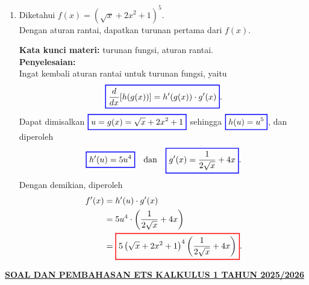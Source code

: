 \documentclass[10pt,openany,a4paper]{article}
\theoremstyle{definition}
\theoremstyle{definition}
\theoremstyle{plain}
\newenvironment{jawab}[2][tes]{%
\par\noindent\textbf{Kata kunci materi:} #1.\\
\textbf{Penyelesaian:} #2%
}{}
\begin{document}
\begin{enumerate}
\begin{jawab}[limit fungsi, fungsi kontinu, polinomial]
{            }
            \end{jawab}
            \item Diketahui $f(x)=(\sqrt{x}+2x^2+1)^5$.\\
            Dengan aturan rantai, dapatkan turunan pertama dari $f(x)$.
            \begin{jawab}[turunan fungsi, aturan rantai]{~\\
                Ingat kembali aturan rantai untuk turunan fungsi, yaitu
                \[
                \colorlet{oldcolor}{.}
        \color{blue}
        \setlength{\fboxrule}{1pt} \boxed{\color{oldcolor}\frac{d}{dx}[h(g(x))] = h'(g(x)) \cdot g'(x)}\color{oldcolor}.
                \]
                Dapat dimisalkan $\colorlet{oldcolor}{.}
        \color{blue}
        \setlength{\fboxrule}{1pt} \boxed{\color{oldcolor}u=g(x) = \sqrt{x}+2x^2+1}\color{oldcolor}$ sehingga $\colorlet{oldcolor}{.}
        \color{blue}
        \setlength{\fboxrule}{1pt} \boxed{\color{oldcolor}h(u) = u^{5}}\color{oldcolor}$, dan diperoleh
                \begin{align*}
                    \colorlet{oldcolor}{.}
        \color{blue}
        \setlength{\fboxrule}{1pt} \boxed{\color{oldcolor}h'(u) = 5u^{4}}\color{oldcolor} \quad \text{dan}\quad
                    \colorlet{oldcolor}{.}
        \color{blue}
        \setlength{\fboxrule}{1pt} \boxed{\color{oldcolor}g'(x) = \frac{1}{2\sqrt{x}}+4x}\color{oldcolor}.
                \end{align*}
                Dengan demikian, diperoleh
                \begin{align*}
                    f'(x) &= h'(u) \cdot g'(x)\\
                    &= 5u^{4} \cdot \left(\frac{1}{2\sqrt{x}}+4x\right)\\
                    &= \colorlet{oldcolor}{.}
        \color{red}
        \setlength{\fboxrule}{1pt} \boxed{\color{oldcolor}5\left(\sqrt{x}+2x^2+1\right)^{4} \left(\frac{1}{2\sqrt{x}}+4x\right)}\color{oldcolor}.
                \end{align*}
            }
            \end{jawab}
        \end{enumerate}
               \newpage
 \begin{center}
	{\underline{\textbf{\MakeUppercase{Soal dan Pembahasan ETS Kalkulus 1 Tahun 2025/2026}}}}
    \end{center}
\end{document}
